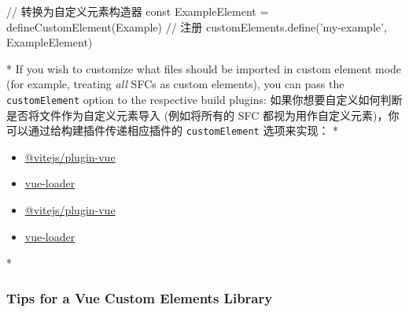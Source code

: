 \begin{paracol}{2}
\begin{codeJs}
// 转换为自定义元素构造器
const ExampleElement = defineCustomElement(Example)
// 注册
customElements.define('my-example', ExampleElement)
\end{codeJs}
\switchcolumn[0]*%
If you wish to customize what files should be imported in custom element
mode (for example, treating \emph{all} SFCs as custom elements), you can
pass the \texttt{customElement} option to the respective build plugins:
\switchcolumn
如果你想要自定义如何判断是否将文件作为自定义元素导入 (例如将所有的 SFC
都视为用作自定义元素)，你可以通过给构建插件传递相应插件的
\texttt{customElement} 选项来实现：
\switchcolumn[0]*%
\begin{itemize}
\item
  \href{https://github.com/vitejs/vite-plugin-vue/tree/main/packages/plugin-vue\#using-vue-sfcs-as-custom-elements}{@vitejs/plugin-vue}
\item
  \href{https://github.com/vuejs/vue-loader/tree/next\#v16-only-options}{vue-loader}
\end{itemize}
\switchcolumn
\begin{itemize}
\item
  \href{https://github.com/vitejs/vite-plugin-vue/tree/main/packages/plugin-vue\#using-vue-sfcs-as-custom-elements}{@vitejs/plugin-vue}
\item
  \href{https://github.com/vuejs/vue-loader/tree/next\#v16-only-options}{vue-loader}
\end{itemize}
\switchcolumn[0]*%
\subsubsection{Tips for a Vue Custom Elements Library}
\switchcolumn

\end{paracol}
